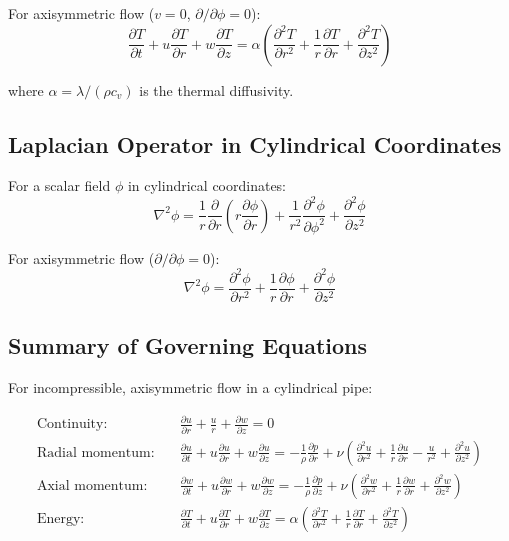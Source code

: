 For axisymmetric flow ($v = 0$, $\partial/\partial\phi = 0$):
\begin{equation}
    \boxed{\frac{\partial T}{\partial t} + u\frac{\partial T}{\partial r} + w\frac{\partial T}{\partial z} = \alpha\left(\frac{\partial^2 T}{\partial r^2} + \frac{1}{r}\frac{\partial T}{\partial r} + \frac{\partial^2 T}{\partial z^2}\right)}
\end{equation}

where $\alpha = \lambda/(\rho c_v)$ is the thermal diffusivity.

\subsection{Laplacian Operator in Cylindrical Coordinates}

For a scalar field $\phi$ in cylindrical coordinates:
\begin{equation}
    \nabla^2 \phi = \frac{1}{r}\frac{\partial}{\partial r}\left(r\frac{\partial \phi}{\partial r}\right) + \frac{1}{r^2}\frac{\partial^2 \phi}{\partial \phi^2} + \frac{\partial^2 \phi}{\partial z^2}
\end{equation}

For axisymmetric flow ($\partial/\partial\phi = 0$):
\begin{equation}
    \nabla^2 \phi = \frac{\partial^2 \phi}{\partial r^2} + \frac{1}{r}\frac{\partial \phi}{\partial r} + \frac{\partial^2 \phi}{\partial z^2}
\end{equation}

\subsection{Summary of Governing Equations}

For incompressible, axisymmetric flow in a cylindrical pipe:

\begin{align}
    \text{Continuity:} \quad & \frac{\partial u}{\partial r} + \frac{u}{r} + \frac{\partial w}{\partial z} = 0 \\[1em]
    \text{Radial momentum:} \quad & \frac{\partial u}{\partial t} + u\frac{\partial u}{\partial r} + w\frac{\partial u}{\partial z} = -\frac{1}{\rho}\frac{\partial p}{\partial r} + \nu\left(\frac{\partial^2 u}{\partial r^2} + \frac{1}{r}\frac{\partial u}{\partial r} - \frac{u}{r^2} + \frac{\partial^2 u}{\partial z^2}\right) \\[1em]
    \text{Axial momentum:} \quad & \frac{\partial w}{\partial t} + u\frac{\partial w}{\partial r} + w\frac{\partial w}{\partial z} = -\frac{1}{\rho}\frac{\partial p}{\partial z} + \nu\left(\frac{\partial^2 w}{\partial r^2} + \frac{1}{r}\frac{\partial w}{\partial r} + \frac{\partial^2 w}{\partial z^2}\right) \\[1em]
    \text{Energy:} \quad & \frac{\partial T}{\partial t} + u\frac{\partial T}{\partial r} + w\frac{\partial T}{\partial z} = \alpha\left(\frac{\partial^2 T}{\partial r^2} + \frac{1}{r}\frac{\partial T}{\partial r} + \frac{\partial^2 T}{\partial z^2}\right)
\end{align}

